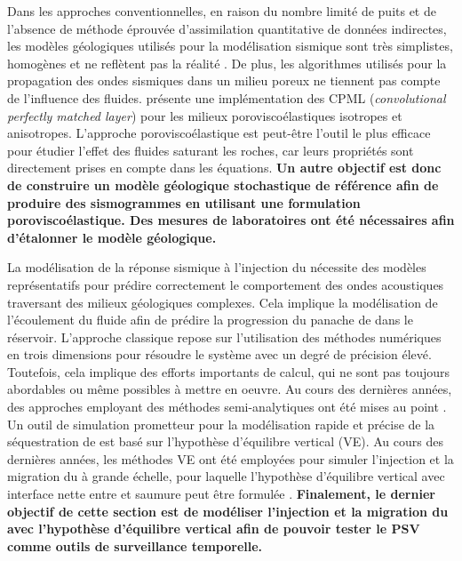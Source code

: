 Dans les approches conventionnelles, en raison du nombre limité de puits et de
l'absence de méthode éprouvée
d'assimilation quantitative de données indirectes, les modèles géologiques
utilisés pour la modélisation sismique sont très simplistes, homogènes et ne
reflètent pas la réalité \citep{DubreuilBoisclair2012,Claprood2013}. De plus,
les algorithmes utilisés pour la propagation des ondes sismiques dans un milieu
poreux
ne tiennent pas compte de l'influence des fluides. \citet{Giroux2012} présente
une implémentation des CPML (\emph{convolutional perfectly matched layer}) pour
les milieux poroviscoélastiques isotropes et anisotropes. L'approche
poroviscoélastique est peut-être l'outil le plus efficace pour étudier l’effet
des
fluides saturant les roches, car leurs propriétés sont directement prises en
compte dans les équations. \textbf{Un autre objectif est donc de
construire un modèle géologique stochastique de référence afin de produire des
sismogrammes en utilisant une formulation poroviscoélastique. Des mesures de
laboratoires ont été nécessaires afin d’étalonner le modèle géologique.}\par

La modélisation de la réponse sismique à l'injection du  nécessite des
modèles représentatifs pour prédire correctement le comportement des ondes
acoustiques traversant des milieux géologiques complexes.
Cela implique la modélisation de l'écoulement du fluide afin de prédire la
progression du panache de  dans le réservoir. L'approche classique
repose sur l'utilisation des méthodes numériques en trois dimensions pour
résoudre le système avec un degré de précision élevé. Toutefois, cela implique
des efforts importants de calcul, qui ne sont pas toujours abordables ou même
possibles à mettre en oeuvre. Au cours des dernières années, des approches
employant des méthodes semi-analytiques ont été mises au point
\citep{Nordbotten2005a, Nordbotten2009}. Un outil de simulation prometteur pour
la modélisation rapide et précise de la séquestration de  est basé sur
l'hypothèse d'équilibre vertical (VE). Au cours des dernières années, les
méthodes VE ont été employées pour simuler l'injection et la migration du
 à grande échelle, pour laquelle l'hypothèse d'équilibre vertical avec
interface nette entre  et saumure peut être formulée
\citep{Nordbotten2005a,Celia2006,Nordbotten2006}. \textbf{Finalement, le dernier
objectif de cette section est de modéliser l'injection et la migration du
 avec l'hypothèse d'équilibre vertical afin de pouvoir tester le PSV
comme outils de surveillance temporelle.}
